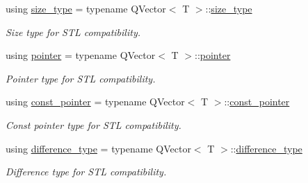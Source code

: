 \begin{DoxyCompactItemize}
using \hyperlink{class_mdt_1_1_plain_text_1_1_record_template_ad2fed94c3d0dc5b0c3e28db212441a27}{size\+\_\+type} = typename Q\+Vector$<$ T $>$\+::\hyperlink{class_mdt_1_1_plain_text_1_1_record_template_ad2fed94c3d0dc5b0c3e28db212441a27}{size\+\_\+type}
\begin{DoxyCompactList}\small\item\em Size type for S\+TL compatibility. \end{DoxyCompactList}\item 
using \hyperlink{class_mdt_1_1_plain_text_1_1_record_template_ab1e3e7564bfe55912676507a2d09bad4}{pointer} = typename Q\+Vector$<$ T $>$\+::\hyperlink{class_mdt_1_1_plain_text_1_1_record_template_ab1e3e7564bfe55912676507a2d09bad4}{pointer}
\begin{DoxyCompactList}\small\item\em Pointer type for S\+TL compatibility. \end{DoxyCompactList}\item 
using \hyperlink{class_mdt_1_1_plain_text_1_1_record_template_a73aada75aed958eafa509e4e7161864c}{const\+\_\+pointer} = typename Q\+Vector$<$ T $>$\+::\hyperlink{class_mdt_1_1_plain_text_1_1_record_template_a73aada75aed958eafa509e4e7161864c}{const\+\_\+pointer}
\begin{DoxyCompactList}\small\item\em Const pointer type for S\+TL compatibility. \end{DoxyCompactList}\item 
using \hyperlink{class_mdt_1_1_plain_text_1_1_record_template_a28b5d1e32418df97716af8a89a22daad}{difference\+\_\+type} = typename Q\+Vector$<$ T $>$\+::\hyperlink{class_mdt_1_1_plain_text_1_1_record_template_a28b5d1e32418df97716af8a89a22daad}{difference\+\_\+type}
\begin{DoxyCompactList}\small\item\em Difference type for S\+TL compatibility. \end{DoxyCompactList}\end{DoxyCompactItemize}
